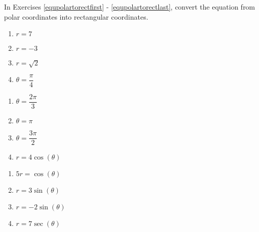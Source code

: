 \documentclass{ximera}
\begin{document}
In Exercises \ref{equpolartorectfirst} - \ref{equpolartorectlast}, convert the equation from polar coordinates into rectangular coordinates.  

\begin{multicols}{4}

\begin{enumerate}

\setcounter{enumi}{\value{HW}}

\item $r = 7$  \label{equpolartorectfirst}
\item $r = -3$ 
\item $r = \sqrt{2}$ 
\item $\theta = \dfrac{\pi}{4}$

\setcounter{HW}{\value{enumi}}

\end{enumerate}

\end{multicols}

\begin{multicols}{4} 

\begin{enumerate}

\setcounter{enumi}{\value{HW}}

\item $\theta = \dfrac{2\pi}{3}$
\item $\theta = \pi$ 
\item $\theta = \dfrac{3\pi}{2}$
\item $r = 4\cos(\theta)$ 

\setcounter{HW}{\value{enumi}}

\end{enumerate}

\end{multicols}

\begin{multicols}{4} 

\begin{enumerate}

\setcounter{enumi}{\value{HW}}

\item $5r = \cos(\theta)$
\item $r = 3\sin(\theta)$
\item $r = -2\sin(\theta)$ 
\item $r = 7\sec(\theta)$

\setcounter{HW}{\value{enumi}}

\end{enumerate}

\end{multicols}
\end{document}

